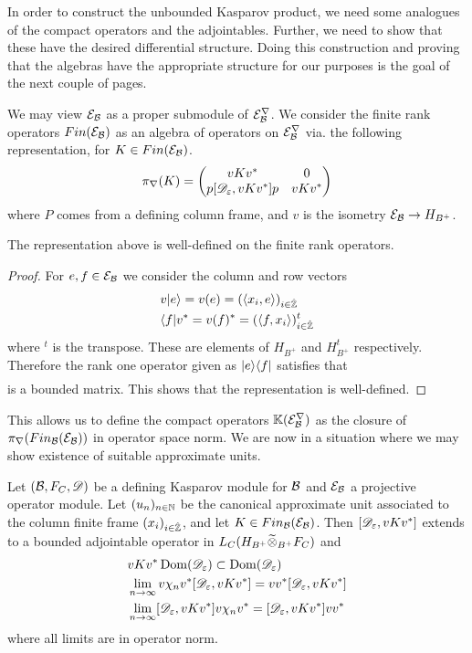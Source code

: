 In order to construct the unbounded Kasparov product, we need some analogues of the compact operators and the adjointables. Further, we need to show that these have the desired differential structure. Doing this construction and proving that the algebras have the appropriate structure for our purposes is the goal of the next couple of pages. 
\begin{definition}
	We may view $\mathcal{E}_{\mathcal{B}}$ as a proper submodule of $\mathcal{E}_{\mathcal{B}}^\nabla$. We consider the finite rank operators $Fin(\mathcal{E}_{\mathcal{B}})$ as an algebra of operators on $\mathcal{E}_{\mathcal{B}}^\nabla$ via. the following representation, for $K\in Fin(\mathcal{E}_{\mathcal{B}})$. 
	\begin{align*}
		\pi_\nabla(K)=\begin{pmatrix} vKv^* & 0 \\ p[\mathscr{D}_\varepsilon,vKv^*]p & vKv^* \end{pmatrix}
	\end{align*}
	where $P$ comes from a defining column frame, and $v$ is the isometry $\mathcal{E}_{\mathcal{B}}\to H_{B^+}$. 
\end{definition}
\begin{lemma}
	The representation above is well-defined on the finite rank operators. 
\end{lemma}
\begin{proof}
For $e,f\in \mathcal{E}_{\mathcal{B}}$ we consider the column and row vectors 
\begin{align*}
	&v\lvert e \rangle=v(e)=(\left \langle x_i,e \right \rangle)_{i\in \hat{\mathbb{Z}}} \\
	&\langle f \rvert v^*=v(f)^*=(\left \langle f,x_i \right \rangle)_{i\in \hat{\mathbb{Z}}}^t
\end{align*}
where $^t$ is the transpose. These are elements of $H_{B^+}$ and $H_{B^+}^t$ respectively. Therefore the rank one operator given as $\lvert e \rangle\langle f \rvert$ satisfies that 
\begin{align*}
	[\D_\epsilon,v\ket{e} \bra{f} v^*]
\end{align*}
is a bounded matrix. This shows that the representation is well-defined.
\end{proof}
This allows us to define the compact operators $\mathbb{K}(\mathcal{E}^\nabla_{\mathcal{B}})$ as the closure of $\pi_\nabla(Fin_{\mathcal{B}}(\mathcal{E}_{\mathcal{B}}))$ in operator space norm. We are now in a situation where we may show existence of suitable approximate units. 
\begin{lemma}
	Let $(\mathcal{B},F_C,\mathscr{D})$ be a defining Kasparov module for $\mathcal{B}$ and $\mathcal{E}_{\mathcal{B}}$ a projective operator module. Let  $(u_n)_{n\in \mathbb{N}}$ be the canonical approximate unit associated to the column finite frame $(x_i)_{i\in \hat{\mathbb{Z}}}$, and let $K\in Fin_{\mathcal{B}}(\mathcal{E}_{\mathcal{B}})$. Then $[\mathscr{D}_\varepsilon,vKv^*]$ extends to a bounded adjointable operator in $L_C(H_{B^+}\widetilde{\otimes}_{B^+} F_C)$ and 
	\begin{align}
		&vKv^* \operatorname{Dom} (\mathscr{D}_\varepsilon) \subset \operatorname{Dom} (\mathscr{D}_\varepsilon) \\
		&\lim_{n\to \infty} v\chi_n v^* [\mathscr{D}_\varepsilon,vKv^*]=vv^*[\mathscr{D}_\varepsilon,vKv^*] \\
		&\lim_{n\to \infty}[\mathscr{D}_\varepsilon,vKv^*]v\chi_nv^*=[\mathscr{D}_\varepsilon,vKv^*]vv^*
	\end{align}
	where all limits are in operator norm. 
\end{lemma}
